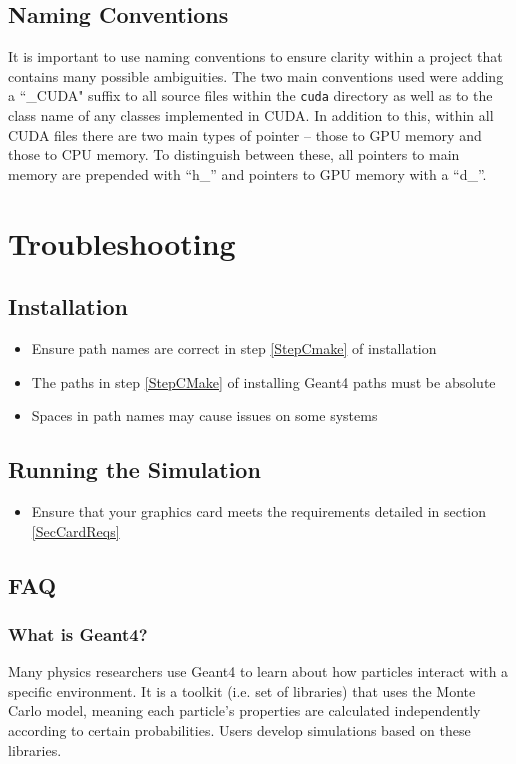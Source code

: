 \documentclass[12pt]{article}
\begin{document}
\subsection{Naming Conventions} %
It is important to use naming conventions to ensure clarity within a project that contains many possible ambiguities. The two main conventions used were adding a ``\_CUDA" suffix to all source files within the \texttt{cuda} directory as well as to the class name of any classes implemented in CUDA. In addition to this, within all CUDA files there are two main types of pointer -- those to GPU memory and those to CPU memory. To distinguish between these, all pointers to main memory are prepended with ``h\_'' and pointers to GPU memory with a ``d\_''.

\section{Troubleshooting}\label{SecTroubleshooting} %
\subsection{Installation} %
\begin{itemize}
\item Ensure path names are correct in step \ref{StepCmake} of installation
\item The paths in step \ref{StepCMake} of installing Geant4 paths must be absolute
\item Spaces in path names may cause issues on some systems
\end{itemize}

\subsection{Running the Simulation} %
\begin{itemize}
\item Ensure that your graphics card meets the requirements detailed in section \ref{SecCardReqs}
\end{itemize}

\subsection{FAQ} %
\subsubsection{What is Geant4?}
Many physics researchers use Geant4 to learn about how particles interact with a specific environment. It is a toolkit (i.e. set of libraries) that uses the Monte Carlo model, meaning each particle's properties are calculated independently according to certain probabilities. Users develop simulations based on these libraries.
\end{document}
